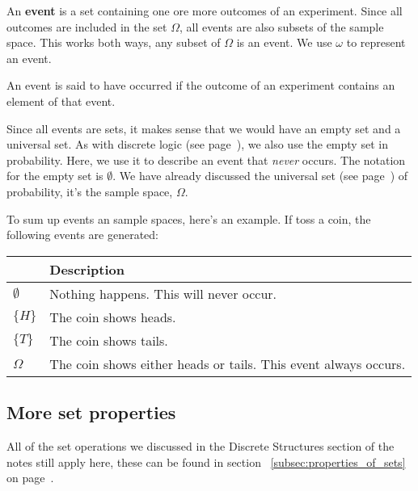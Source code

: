 An {\bf event} is a set containing one ore more outcomes of an experiment. Since
all outcomes are included in the set $\Omega$, all events are also subsets of
the sample space. This works both ways, any subset of $\Omega$ is an event. We
use $\omega$ to represent an event.

An event is said to have occurred if the outcome of an experiment contains an
element of that event.

Since all events are sets, it makes sense that we would have an empty set and a
universal set. As with discrete logic (see page~\pageref{subsubsec:empty_set}),
we also use the empty set in probability. Here, we use it to describe an event
that {\it never} occurs. The notation for the empty set is $\emptyset$. We have
already discussed the universal set (see page~\pageref{subsubsec:universal_set})
of probability, it's the sample space, $\Omega$.


To sum up events an sample spaces, here's an example. If toss a coin, the
following events are generated:

\begin{center}
	\begin{tabular}{|>{\centering\arraybackslash}m{1cm}|m{8cm}|}
		\hline
		{\bf Event} & {\bf Description}\\ \hline
		$\emptyset$ & Nothing happens. This will never occur.\\ \hline
		$\{H\}$     & The coin shows heads.\\ \hline
		$\{T\}$     & The coin shows tails.\\ \hline
		$\Omega$    & The coin shows either heads or tails. This event always occurs.\\
		\hline
	\end{tabular}
\end{center}


\subsection{More set properties}

All of the set operations we discussed in the Discrete Structures section of the
notes still apply here, these can be found in section
~\ref{subsec:properties_of_sets} on page~\pageref{subsec:properties_of_sets}.

